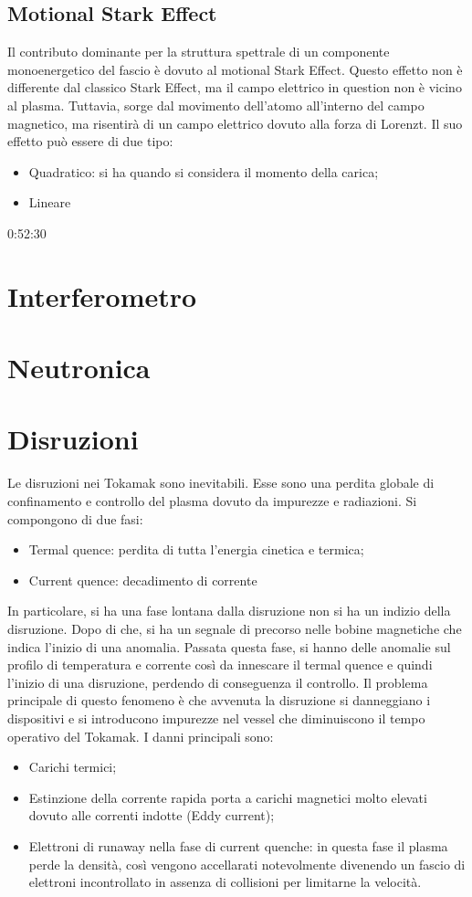 \documentclass{article}
\begin{document}
\subsection{Motional Stark Effect}
Il contributo dominante per la struttura spettrale di un componente monoenergetico del fascio è dovuto al motional Stark Effect. Questo effetto non è differente dal classico Stark Effect, ma il campo elettrico in question non è vicino al plasma. Tuttavia, sorge dal movimento dell'atomo all'interno del campo magnetico, ma risentirà di un campo elettrico dovuto alla forza di Lorenzt.\newline
Il suo effetto può essere di due tipo:\begin{itemize}
    \item Quadratico: si ha quando si considera il momento della carica;
    \item Lineare
\end{itemize}
0:52:30
\section{Interferometro}

\section{Neutronica}
\section{Disruzioni}
Le disruzioni nei Tokamak sono inevitabili. Esse sono una perdita globale di confinamento e controllo del plasma dovuto da impurezze e radiazioni.\newline
Si compongono di due fasi:
\begin{itemize}
    \item Termal quence: perdita di tutta l'energia cinetica e termica;
    \item Current quence: decadimento di corrente
\end{itemize}
In particolare, si ha una fase lontana dalla disruzione non si ha un indizio della disruzione. Dopo di che, si ha un segnale di precorso nelle bobine magnetiche che indica l'inizio di una anomalia. Passata questa fase, si hanno delle anomalie sul profilo di temperatura e corrente così da innescare il termal quence e quindi l'inizio di una disruzione, perdendo di conseguenza il controllo.\newline
Il problema principale di questo fenomeno è che avvenuta la disruzione si danneggiano i dispositivi e si introducono impurezze nel vessel che diminuiscono il tempo operativo del Tokamak. I danni principali sono:
\begin{itemize}
    \item Carichi termici;
    \item Estinzione della corrente rapida porta a carichi magnetici molto elevati dovuto alle correnti indotte (Eddy current);
    \item Elettroni di runaway nella fase di current quenche: in questa fase il plasma perde la densità, così vengono accellarati notevolmente divenendo un fascio di elettroni incontrollato in assenza di collisioni per limitarne la velocità.
\end{itemize}
\end{document}
